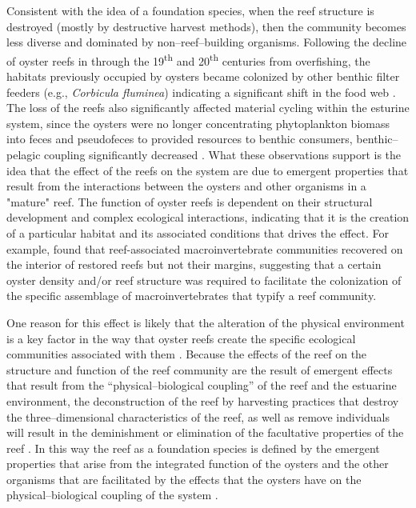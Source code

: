 \documentclass{article}
\begin{document}
Consistent with the idea of a foundation species, when the reef structure is destroyed (mostly by destructive harvest methods), then the community becomes less diverse and dominated by non--reef--building organisms. Following the decline of oyster reefs in through the 19\textsuperscript{th} and 20\textsuperscript{th} centuries from overfishing, the habitats previously occupied by oysters became colonized by other benthic filter feeders (e.g., \emph{Corbicula fluminea}) indicating a significant shift in the food web \cite{newell_ecological_1988}. The loss of the reefs also significantly affected material cycling within the esturine system, since the oysters were no longer concentrating phytoplankton biomass into feces and pseudofeces to provided resources to benthic consumers, benthic--pelagic coupling significantly decreased \cite{newell_ecological_1988}. What these observations support is the idea that the effect of the reefs on the system are due to emergent properties that result from the interactions between the oysters and other organisms in a "mature" reef. The function of oyster reefs is dependent on their structural development and complex ecological interactions, indicating that it is the creation of a particular habitat and its associated conditions that drives the effect. For example,  found that reef-associated macroinvertebrate communities recovered on the interior of restored reefs but not their margins, suggesting that a certain oyster density and/or reef structure was required to facilitate the colonization of the specific assemblage of  macroinvertebrates that typify a reef community. 

One reason for this effect is likely that the alteration of the physical environment is a key factor in the way that oyster reefs create the specific ecological communities associated with them \cite{lenihan_physicalbiological_1999, searles_oyster_2022}. Because the effects of the reef on the structure and function of the reef community are the result of emergent effects that result from the ``physical--biological coupling'' of the reef and the estuarine environment, the deconstruction of the reef by harvesting practices that destroy the three--dimensional characteristics of the reef, as well as remove individuals will result in the deminishment or elimination of the facultative properties of the reef \cite{lenihan_physicalbiological_1999}. In this way the reef as a foundation species is defined by the emergent properties that arise from the integrated function of the oysters and the other organisms that are facilitated by the effects that the oysters have on the physical--biological coupling of the system \cite{lenihan_physicalbiological_1999, ellison_loss_2005, angelini_interactions_2011}. 
\end{document}
